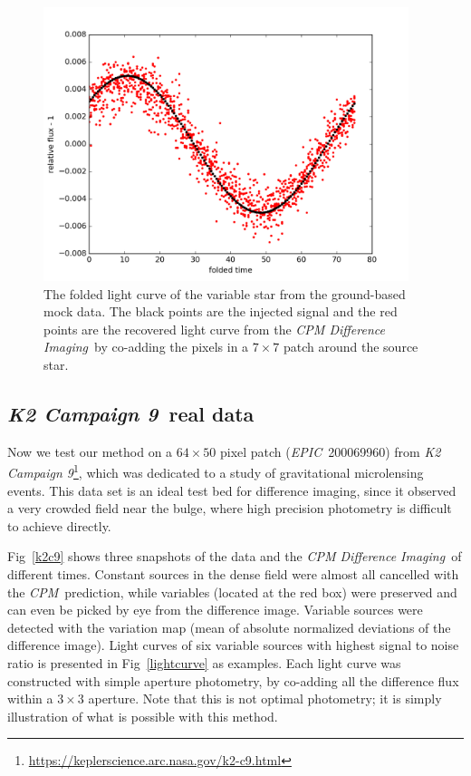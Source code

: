 \documentclass[12pt, preprint]{aastex}
\newcommand{\project}[1]{\textsl{#1}}
\newcommand{\cpm}{\project{CPM}}
\newcommand{\cpmdiff}{\project{CPM Difference Imaging}}
\newcommand{\KTCN}{\project{K2 Campaign 9}}
\newcommand{\epic}{\project{EPIC}}
\begin{document}
\begin{figure}[p]
\begin{center}
\includegraphics[width=0.95\textwidth]{f4a}
\end{center}
\caption{
\label{ground_lc}
 The folded light curve of the variable star from the ground-based mock data.
 The black points are the injected signal and the red points are the recovered light curve from the \cpmdiff\ by co-adding the pixels in a $7\times 7$ patch around the source star.
}
\end{figure}

\subsection{\KTCN\ real data}
Now we test our method on a $64\times50$ pixel patch (\epic\ 200069960) from \KTCN\footnote{\url{https://keplerscience.arc.nasa.gov/k2-c9.html}}\citep{k2c9}, which was dedicated to a study of gravitational microlensing events.
This data set is an ideal test bed for difference imaging, since it observed a very crowded field near the bulge, where high precision photometry is difficult to achieve directly.

Fig~\ref{k2c9} shows three snapshots of the data and the \cpmdiff\ of different times.
Constant sources in the dense field were almost all cancelled with the \cpm\ prediction, while variables (located at the red box) were preserved and can even be picked by eye from the difference image.
Variable sources were detected with the variation map (mean of absolute normalized deviations of the difference image). 
Light curves of six variable sources with highest signal to noise ratio is presented in Fig~\ref{lightcurve} as examples. 
Each light curve was constructed with simple aperture photometry, by co-adding all the difference flux within a $3 \times 3$ aperture. 
Note that this is not optimal photometry; it is simply illustration of what is possible with this method.
\end{document}
